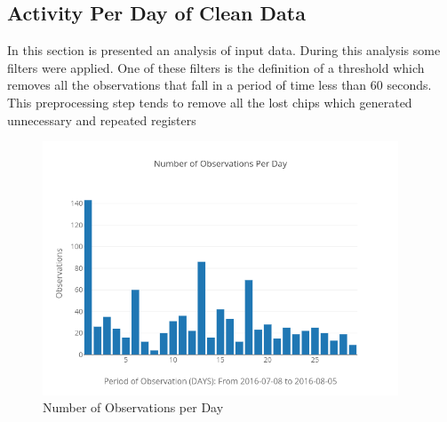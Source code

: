 \documentclass[11pt,fleqn]{book} %
\begin{document}
\subsection{Activity Per Day of Clean Data}%
\label{subsec:Activity Per Day of Clean Data}%
In this section is presented an analysis of input data. During this analysis some filters were applied. One of these filters is the definition of a threshold which removes all the observations that fall in a period of time less than 60 seconds. This preprocessing step tends to  remove all the lost chips which generated unnecessary and repeated registers %


\begin{figure}[h!]%
\centering%
\includegraphics[width=400px]{Pictures/plots/good/Morelia Hive 1observationsPerdayClean.png}%
\caption{Number of Observations per Day}%
\end{figure}
\end{document}
